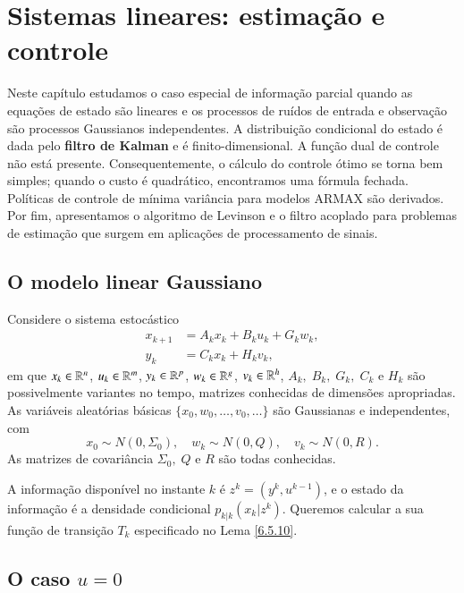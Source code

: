 \chapter{Sistemas lineares: estimação e controle}

Neste capítulo estudamos o caso especial de informação parcial quando as equações de estado são lineares e os processos de ruídos de entrada e observação são processos Gaussianos independentes. A distribuição condicional do estado é dada pelo \textbf{filtro de Kalman} e é finito-dimensional. A função dual de controle não está presente. Consequentemente, o cálculo do controle ótimo se torna bem simples; quando o custo é quadrático, encontramos uma fórmula fechada. Políticas de controle de mínima variância para modelos ARMAX  são derivados. Por fim, apresentamos o algoritmo de Levinson e o filtro acoplado para problemas de estimação que surgem em aplicações de processamento de sinais.




\section{O modelo linear Gaussiano}
Considere o sistema estocástico
\[
\begin{aligned}
x_{k+1}&=A_kx_k+B_ku_k+G_kw_k,\\
y_k&=C_kx_k+H_kv_k,
\end{aligned}
\]
em que $x_k\in\mathbb{R}^{n}$, $u_k\in\mathbb{R}^m$, $y_k\in\mathbb{R}^p$, $w_k\in\mathbb{R}^g$, $v_k\in\mathbb{R}^h$, $A_k,\;B_k,\;G_k,\;C_k$ e $H_k$ são possivelmente variantes no tempo, matrizes conhecidas de dimensões apropriadas. As variáveis aleatórias básicas $\{x_0,w_0,\dots,v_0,\dots\}$ são Gaussianas e independentes, com
\[
x_0\sim N(0,\Sigma_0), \quad w_k\sim N(0,Q), \quad v_k\sim N(0,R).
\]
As matrizes de covariância $\Sigma_0,\;Q$ e $R$ são todas conhecidas.

A informação disponível no instante $k$ é $z^k=(y^k,u^{k-1})$, e o estado da informação é a densidade condicional $p_{k|k}(x_k|z^k)$. Queremos calcular a sua função de transição $T_k$ especificado no Lema \ref{6.5.10}.




\section{O caso $u=0$}

